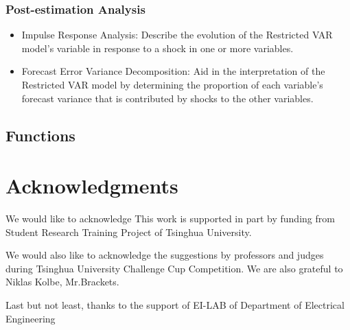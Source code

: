 \documentclass[10pt]{article}
\numberwithin{equation}{section}
\numberwithin{table}{section}
\numberwithin{figure}{section}
\begin{document}
\subsubsection{Post-estimation Analysis}
\begin{itemize}
  \item Impulse Response Analysis: Describe the evolution of the Restricted VAR model’s variable in response to a shock in one or more variables.
  \item Forecast Error Variance Decomposition: Aid in the interpretation of the Restricted VAR model by determining the proportion of each variable’s forecast variance that is contributed by shocks to the other variables.
\end{itemize}




\subsection{Functions}



\newpage
\section{Acknowledgments} \label{sec:thanks}

We would like to acknowledge 
This work is supported in part by funding from Student Research Training Project of Tsinghua University.

We would also like to acknowledge the suggestions by professors and judges during Tsinghua University Challenge Cup Competition. We are also grateful to Niklas Kolbe, Mr.Brackets.

Last but not least, thanks to the support of EI-LAB of Department of Electrical Engineering
\end{document}
